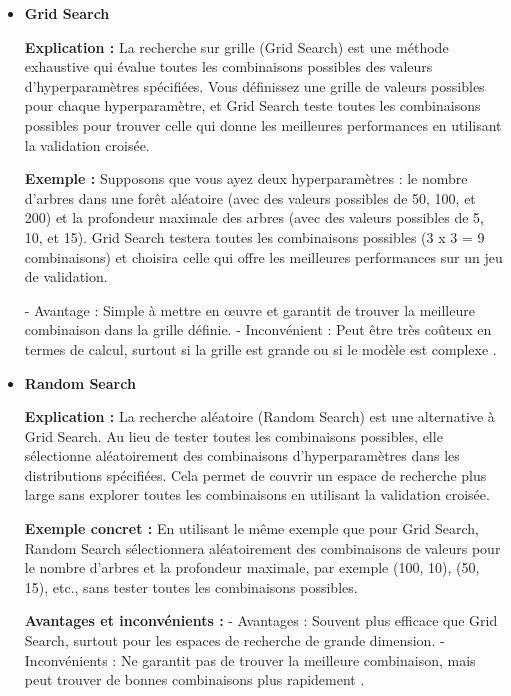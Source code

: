 \documentclass[10pt,a4paper]{article}
\begin{document}
\begin{itemize}
    \item \textbf{Grid Search}

    \textbf{Explication :}
    La recherche sur grille (Grid Search) est une méthode exhaustive qui évalue toutes les combinaisons possibles des valeurs d'hyperparamètres spécifiées. Vous définissez une grille de valeurs possibles pour chaque hyperparamètre, et Grid Search teste toutes les combinaisons possibles pour trouver celle qui donne les meilleures performances en utilisant la validation croisée.

    \textbf{Exemple :}
    Supposons que vous ayez deux hyperparamètres : le nombre d'arbres dans une forêt aléatoire (avec des valeurs possibles de 50, 100, et 200) et la profondeur maximale des arbres (avec des valeurs possibles de 5, 10, et 15). Grid Search testera toutes les combinaisons possibles (3 x 3 = 9 combinaisons) et choisira celle qui offre les meilleures performances sur un jeu de validation.

    - Avantage : Simple à mettre en œuvre et garantit de trouver la meilleure combinaison dans la grille définie.
    - Inconvénient : Peut être très coûteux en termes de calcul, surtout si la grille est grande ou si le modèle est complexe \cite{hyperparameter_tuning}.

    \item \textbf{Random Search}

    \textbf{Explication :}
    La recherche aléatoire (Random Search) est une alternative à Grid Search. Au lieu de tester toutes les combinaisons possibles, elle sélectionne aléatoirement des combinaisons d'hyperparamètres dans les distributions spécifiées. Cela permet de couvrir un espace de recherche plus large sans explorer toutes les combinaisons en utilisant la validation croisée.

    \textbf{Exemple concret :}
    En utilisant le même exemple que pour Grid Search, Random Search sélectionnera aléatoirement des combinaisons de valeurs pour le nombre d'arbres et la profondeur maximale, par exemple (100, 10), (50, 15), etc., sans tester toutes les combinaisons possibles.

    \textbf{Avantages et inconvénients :}
    - Avantages : Souvent plus efficace que Grid Search, surtout pour les espaces de recherche de grande dimension.
    - Inconvénients : Ne garantit pas de trouver la meilleure combinaison, mais peut trouver de bonnes combinaisons plus rapidement \cite{hyperparameter_tuning}.


\end{itemize}
\end{document}
